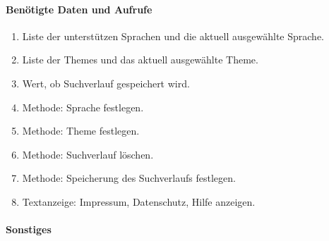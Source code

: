 \paragraph{Benötigte Daten und Aufrufe}
\begin{enumerate}
    \item Liste der unterstützen Sprachen und die aktuell ausgewählte Sprache.
    \item Liste der Themes und das aktuell ausgewählte Theme.
    \item Wert, ob Suchverlauf gespeichert wird.
    \item Methode: Sprache festlegen.
    \item Methode: Theme festlegen.
    \item Methode: Suchverlauf löschen.
    \item Methode: Speicherung des Suchverlaufs festlegen.
    \item Textanzeige: Impressum, Datenschutz, Hilfe anzeigen.
\end{enumerate}
\paragraph{Sonstiges}
